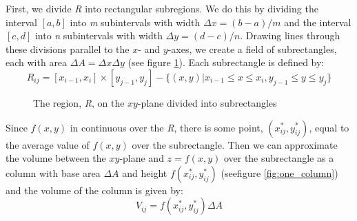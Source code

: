 First, we divide \textit{R} into rectangular subregions. We do this by 
dividing the interval $[a, b]$ into \textit{m} subintervals with width $\Delta 
x = (b - a)/m$ and the interval $[c, d]$ into \textit{n} subintervals with 
width $\Delta y = (d - c) / n$. Drawing lines through these divisions parallel 
to the $x$- and $y$-axes, we create a field of subrectangles, each with area 
$\Delta A = \Delta x \Delta y$ (see figure \ref{fig:subrectangles}). Each 
subrectangle is defined by:
$$\textit{R}_{ij} = [x_{i - 1}, x_i] \times [y_{j - 1}, y_j] - \{ (x, y) | x_{
i - 1} \leq x \leq x_i, y_{j - 1} \leq y \leq y_j \}$$ 

\begin{figure}[htbp]
    \centering
    \caption{The region, \textit{R}, on the $xy$-plane divided into 
    subrectangles}
    \label{fig:subrectangles}
\end{figure}

Since $f(x,y)$ in continuous over the \textit{R}, there is some point, $(x_{ij}
^*, y_{ij}^*)$, equal to the average value of $f(x,y)$ over the subrectangle. 
Then we can approximate the volume between the $xy$-plane and $z = f(x,y)$ over
the subrectangle as a column with base area $\Delta A$ and height $f(x_{ij}^*, 
y_{ij}^*)$ (seefigure \ref{fig:one_column}) and the volume of the column is 
given by:
$$V_{ij} = f(x_{ij}^*, y_{ij}^*) \Delta A$$

